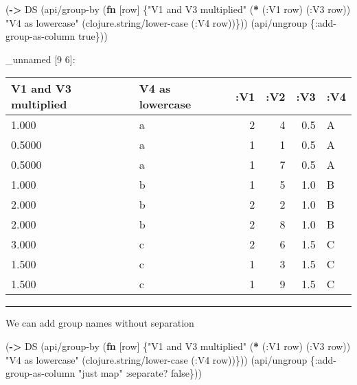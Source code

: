 \documentclass[]{article}
\newenvironment{Shaded}{\begin{snugshade}}{\end{snugshade}}
\newcommand{\KeywordTok}[1]{\textcolor[rgb]{0.13,0.29,0.53}{\textbf{#1}}}
\newcommand{\StringTok}[1]{\textcolor[rgb]{0.31,0.60,0.02}{#1}}
\newcommand{\VariableTok}[1]{\textcolor[rgb]{0.00,0.00,0.00}{#1}}
\newcommand{\AttributeTok}[1]{\textcolor[rgb]{0.77,0.63,0.00}{#1}}
\newcommand{\NormalTok}[1]{#1}
\begin{document}
\begin{Shaded}
\begin{Highlighting}[]
\NormalTok{(}\KeywordTok{->}\NormalTok{ DS}
\NormalTok{    (api/group-by (}\KeywordTok{fn}\NormalTok{ [row] \{}\StringTok{"V1 and V3 multiplied"}\NormalTok{ (}\KeywordTok{*}\NormalTok{ (}\AttributeTok{:V1}\NormalTok{ row)}
\NormalTok{                                                      (}\AttributeTok{:V3}\NormalTok{ row))}
                            \StringTok{"V4 as lowercase"}\NormalTok{ (clojure.string/lower-case (}\AttributeTok{:V4}\NormalTok{ row))\}))}
\NormalTok{    (api/ungroup \{}\AttributeTok{:add-group-as-column} \VariableTok{true}\NormalTok{\}))}
\end{Highlighting}
\end{Shaded}

\_unnamed {[}9 6{]}:

\begin{longtable}[]{@{}llrrrl@{}}
\toprule
V1 and V3 multiplied & V4 as lowercase & :V1 & :V2 & :V3 &
:V4\tabularnewline
\midrule
\endhead
1.000 & a & 2 & 4 & 0.5 & A\tabularnewline
0.5000 & a & 1 & 1 & 0.5 & A\tabularnewline
0.5000 & a & 1 & 7 & 0.5 & A\tabularnewline
1.000 & b & 1 & 5 & 1.0 & B\tabularnewline
2.000 & b & 2 & 2 & 1.0 & B\tabularnewline
2.000 & b & 2 & 8 & 1.0 & B\tabularnewline
3.000 & c & 2 & 6 & 1.5 & C\tabularnewline
1.500 & c & 1 & 3 & 1.5 & C\tabularnewline
1.500 & c & 1 & 9 & 1.5 & C\tabularnewline
\bottomrule
\end{longtable}

\begin{center}\rule{0.5\linewidth}{0.5pt}\end{center}

We can add group names without separation

\begin{Shaded}
\begin{Highlighting}[]
\NormalTok{(}\KeywordTok{->}\NormalTok{ DS}
\NormalTok{    (api/group-by (}\KeywordTok{fn}\NormalTok{ [row] \{}\StringTok{"V1 and V3 multiplied"}\NormalTok{ (}\KeywordTok{*}\NormalTok{ (}\AttributeTok{:V1}\NormalTok{ row)}
\NormalTok{                                                      (}\AttributeTok{:V3}\NormalTok{ row))}
                            \StringTok{"V4 as lowercase"}\NormalTok{ (clojure.string/lower-case (}\AttributeTok{:V4}\NormalTok{ row))\}))}
\NormalTok{    (api/ungroup \{}\AttributeTok{:add-group-as-column} \StringTok{"just map"}
                  \AttributeTok{:separate}\NormalTok{? }\VariableTok{false}\NormalTok{\}))}
\end{Highlighting}
\end{Shaded}
\end{document}
